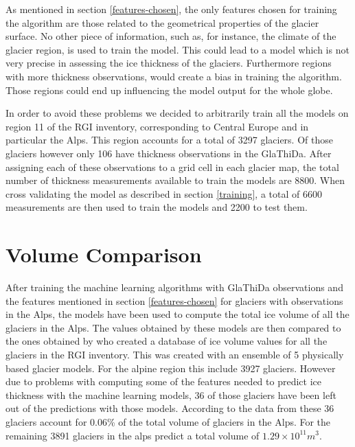 As mentioned in section \ref{features-chosen}, the only features chosen for training the algorithm are those related to the geometrical properties of the glacier surface. No other piece of information, such as, for instance, the climate of the glacier region, is used to train the model. This could lead to a model which is not very precise in assessing the ice thickness of the glaciers. Furthermore regions with more thickness observations, would create a bias in training the algorithm. Those regions could end up influencing the model output for the whole globe.

In order to avoid these problems we decided to arbitrarily train all the models on region 11 of the RGI inventory, corresponding to Central Europe and in particular the Alps. This region accounts for a total of 3297 glaciers. Of those glaciers however only 106 have thickness observations in the GlaThiDa. After assigning each of these observations to a grid cell in each glacier map, the total number of thickness measurements available to train the models are 8800. When cross validating the model as described in section \ref{training}, a total of 6600 measurements are then used to train the models and 2200 to test them.

\section{Volume Comparison}
After training the machine learning algorithms with GlaThiDa observations and the features mentioned in section \ref{features-chosen} for glaciers with observations in the Alps, the models have been used to compute the total ice volume of all the glaciers in the Alps. The values obtained by these models are then compared to the ones obtained by \citet{Farinotti2019} who created a database of ice volume values for all the glaciers in the RGI inventory. This was created with an ensemble of 5 physically based glacier models. For the alpine region this include 3927 glaciers. However due to problems with computing some of the features needed to predict ice thickness with the machine learning models, 36 of those glaciers have been left out of the predictions with those models. According to the data from \citet{Farinotti2019} these 36 glaciers account for 0.06\% of the total volume of glaciers in the Alps. For the remaining 3891 glaciers in the alps \citet{Farinotti2019} predict a total volume of $1.29\times 10^{11}m^3$.

